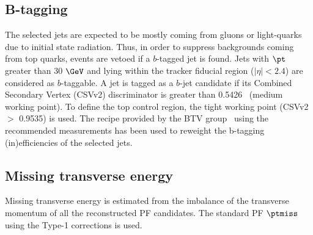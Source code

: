 \subsection{B-tagging}

The selected jets are expected to be mostly coming from gluons or light-quarks
due to initial state radiation. Thus, in order to suppress backgrounds coming from top quarks, events are vetoed if a $b$-tagged jet is found.
Jets with $\pt$ greater than 30 $\GeV$ and lying within the tracker fiducial region ($\left|\eta\right|<2.4$) are considered as $b$-taggable.
A jet is tagged as a $b$-jet candidate if its Combined Secondary Vertex (CSVv2) discriminator is greater than 0.5426~\cite{Twiki:BtagRecommendation80X} (medium working point). To define the top control region, the tight working point (CSVv2 $>$ 0.9535) is used. The recipe provided by the BTV group~\cite{Twiki:BTAGPOGSF} using the recommended measurements has been used to reweight the b-tagging (in)efficiencies of the selected jets.


\subsection{Missing transverse energy}
Missing transverse energy is estimated from the imbalance of the transverse momentum of all the reconstructed PF candidates. The standard PF $\ptmiss$ using the Type-1 corrections is used. 
